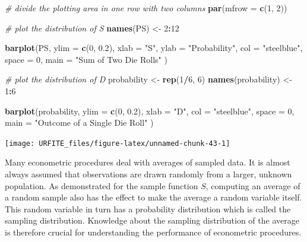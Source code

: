 \documentclass[]{book}
\newenvironment{Shaded}{\begin{snugshade}}{\end{snugshade}}
\newcommand{\KeywordTok}[1]{\textcolor[rgb]{0.13,0.29,0.53}{\textbf{#1}}}
\newcommand{\DataTypeTok}[1]{\textcolor[rgb]{0.13,0.29,0.53}{#1}}
\newcommand{\DecValTok}[1]{\textcolor[rgb]{0.00,0.00,0.81}{#1}}
\newcommand{\FloatTok}[1]{\textcolor[rgb]{0.00,0.00,0.81}{#1}}
\newcommand{\StringTok}[1]{\textcolor[rgb]{0.31,0.60,0.02}{#1}}
\newcommand{\CommentTok}[1]{\textcolor[rgb]{0.56,0.35,0.01}{\textit{#1}}}
\newcommand{\OperatorTok}[1]{\textcolor[rgb]{0.81,0.36,0.00}{\textbf{#1}}}
\newcommand{\NormalTok}[1]{#1}
\theoremstyle{definition}
\theoremstyle{definition}
\theoremstyle{definition}
\theoremstyle{remark}
\begin{document}
\begin{Shaded}
\begin{Highlighting}[]
\CommentTok{# divide the plotting area in one row with two columns}
\KeywordTok{par}\NormalTok{(}\DataTypeTok{mfrow =} \KeywordTok{c}\NormalTok{(}\DecValTok{1}\NormalTok{, }\DecValTok{2}\NormalTok{))}

\CommentTok{# plot the distribution of S}
\KeywordTok{names}\NormalTok{(PS) <-}\StringTok{ }\DecValTok{2}\OperatorTok{:}\DecValTok{12}

\KeywordTok{barplot}\NormalTok{(PS, }\DataTypeTok{ylim =} \KeywordTok{c}\NormalTok{(}\DecValTok{0}\NormalTok{, }\FloatTok{0.2}\NormalTok{), }
        \DataTypeTok{xlab =} \StringTok{"S"}\NormalTok{, }
        \DataTypeTok{ylab =} \StringTok{"Probability"}\NormalTok{, }
        \DataTypeTok{col =} \StringTok{"steelblue"}\NormalTok{, }
        \DataTypeTok{space =} \DecValTok{0}\NormalTok{, }
        \DataTypeTok{main =} \StringTok{"Sum of Two Die Rolls"}
\NormalTok{        )}

\CommentTok{# plot the distribution of D }
\NormalTok{probability <-}\StringTok{ }\KeywordTok{rep}\NormalTok{(}\DecValTok{1}\OperatorTok{/}\DecValTok{6}\NormalTok{, }\DecValTok{6}\NormalTok{)}
\KeywordTok{names}\NormalTok{(probability) <-}\StringTok{ }\DecValTok{1}\OperatorTok{:}\DecValTok{6}

\KeywordTok{barplot}\NormalTok{(probability, }
        \DataTypeTok{ylim =} \KeywordTok{c}\NormalTok{(}\DecValTok{0}\NormalTok{, }\FloatTok{0.2}\NormalTok{), }
        \DataTypeTok{xlab =} \StringTok{"D"}\NormalTok{, }
        \DataTypeTok{col =} \StringTok{"steelblue"}\NormalTok{, }
        \DataTypeTok{space =} \DecValTok{0}\NormalTok{, }
        \DataTypeTok{main =} \StringTok{"Outcome of a Single Die Roll"}
\NormalTok{        )}
\end{Highlighting}
\end{Shaded}

\begin{center}\texttt{[image: URFITE\_files/figure-latex/unnamed-chunk-43-1]} \end{center}

Many econometric procedures deal with averages of sampled data. It is
almost always assumed that observations are drawn randomly from a
larger, unknown population. As demonstrated for the sample function
\(S\), computing an average of a random sample also has the effect to
make the average a random variable itself. This random variable in turn
has a probability distribution which is called the sampling
distribution. Knowledge about the sampling distribution of the average
is therefore crucial for understanding the performance of econometric
procedures.
\end{document}
